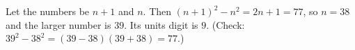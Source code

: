 Let the numbers be $n+1$ and $n$. Then $(n+1)^2-n^2=2n+1=77$, so $n=38$ and the larger number is $39$. Its units digit is $\boxed{9}$. (Check: $39^2-38^2=(39-38)(39+38)=77$.)
